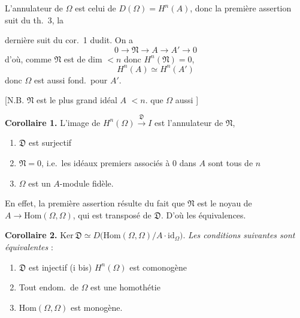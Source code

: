 \documentclass[11pt,a4paper]{article}
\begin{document}
L'annulateur de $\Omega$ est celui de $D(\Omega) = H^n(A)$, donc
 la première assertion suit du th.\ 3, la

dernière suit du cor.\ 1 dudit. On a
\[
  0 \longrightarrow \mathfrak{N} \longrightarrow A \longrightarrow A'
  \longrightarrow 0
\]
d'où, comme $\mathfrak{N}$ est de dim $< n$ donc $H^n(\mathfrak{N}) = 0$,
\[
  H^n(A) \simeq H^n(A')
\]
donc $\Omega$ est aussi fond.\ pour $A'$.

[N.B. $\mathfrak{N}$ est le plus grand idéal  $A$ \ill{}
 $< n$. \ill{} que $\Omega$ aussi \ill{} \ill{}
\ill{}]

\textbf{Corollaire 1.} L'image de $H^n(\Omega) \xrightarrow{\mathfrak{D}} I$
est l'annulateur de $\mathfrak{N}$,
\begin{enumerate}
  \item[(i)] $\mathfrak{D}$ est surjectif
  \item[(ii)] $\mathfrak{N} = 0$, i.e.\ les idéaux premiers associés à $0$
    dans $A$ sont tous de   $n$
  \item[(iii)] $\Omega$ est un $A$-module fidèle.
\end{enumerate}

En effet, la première assertion résulte du fait que
$\mathfrak{N}$ est le noyau de $A \to \mathrm{Hom}(\Omega, \Omega)$, qui
est transposé de $\mathfrak{D}$. D'où les équivalences.

\textbf{Corollaire 2.}
$\mathrm{Ker}\,\mathfrak{D} \simeq D\bigl(\mathrm{Hom}(\Omega, \Omega) /
A \cdot \mathrm{id}_{\Omega}\bigr)$. \emph{Les conditions suivantes sont
équivalentes} :
\begin{enumerate}
  \item[(i)] $\mathfrak{D}$ est injectif \qquad (i bis) $H^n(\Omega)$ est
    comonogène
  \item[(ii)] Tout endom.\ de $\Omega$ est une homothétie
  \item[(ii bis)] $\mathrm{Hom}(\Omega, \Omega)$ est monogène.
\end{enumerate}
\end{document}

